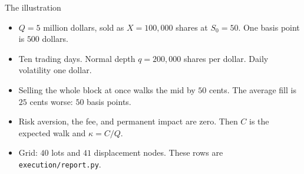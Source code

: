 \documentclass[aspectratio=169,10pt]{beamer}
\newcommand{\currentsource}{}
\newcommand{\framesource}[1]{\gdef\currentsource{#1}}
\newcommand{\aiassisted}{AI assisted, via Grok 4.7}
\begin{document}
\begin{frame}{The illustration}
\framesource{\aiassisted}
\begin{itemize}
\item \(Q=5\) million dollars, sold as \(X=100{,}000\) shares at \(S_0=50\). One basis point is \(500\) dollars.
\item Ten trading days. Normal depth \(q=200{,}000\) shares per dollar. Daily volatility one dollar.
\item Selling the whole block at once walks the mid by \(50\) cents. The average fill is \(25\) cents worse: \(50\) basis points.
\item Risk aversion, the fee, and permanent impact are zero. Then \(C\) is the expected walk and \(\kappa=C/Q\).
\item Grid: \(40\) lots and \(41\) displacement nodes. These rows are \texttt{execution/report.py}.
\end{itemize}
\end{frame}

\newsavebox{\kappatable}

\newsavebox{\downturntable}
\end{document}
